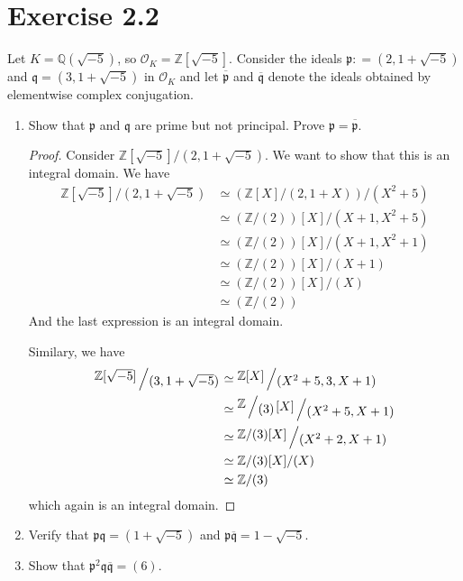 \documentclass[a4paper]{article}
\newcommand{\bigslant}[2]{{\raisebox{.2em}{$#1$}\left/\raisebox{-.2em}{$#2$}\right.}}
\begin{document}
\section*{Exercise 2.2}
Let \(K = \mathbb{Q}(\sqrt{-5})\), so \(\mathcal{O}_K = \mathbb{Z}[\sqrt{-5}]\). Consider the ideals \(\mathfrak{p}: = (2, 1 + \sqrt{-5})\) and \(\mathfrak{q} = (3, 1 + \sqrt{-5})\) in \(\mathcal{O}_K\) and let \(\overline{\mathfrak{p}}\) and \(\overline{\mathfrak{q}}\) denote the ideals obtained by elementwise complex conjugation.
\begin{enumerate}
  \item Show that \(\mathfrak{p}\) and \(\mathfrak{q}\) are prime but not principal. Prove \(\mathfrak{p} = \overline{\mathfrak{p}}\).
  \begin{proof}
    Consider \(\mathbb{Z}[\sqrt{-5}] / (2, 1 + \sqrt{-5})\). We want to show that this is an integral domain. We have
    \begin{align*}
      \mathbb{Z}[\sqrt{-5}] / (2, 1 + \sqrt{-5}) &\simeq (\mathbb{Z}[X] / (2, 1 + X)) / (X^2 + 5) \\
      & \simeq (\mathbb{Z} / (2)) [X] / (X + 1, X^2 + 5) \\
      & \simeq (\mathbb{Z} / (2)) [X] / (X + 1, X^2 + 1) \\
      & \simeq (\mathbb{Z} / (2)) [X] / (X + 1) \\
      & \simeq (\mathbb{Z} / (2)) [X] / (X) \\
      & \simeq (\mathbb{Z} / (2))
    \end{align*}
    And the last expression is an integral domain.

    Similary, we have
    \begin{align*}
      \bigslant{\mathbb{Z}[\sqrt{-5}]}{(3, 1 + \sqrt{-5})} &\simeq \bigslant{\mathbb{Z}[X]}{(X^2 + 5, 3, X + 1)} \\
      &\simeq \bigslant{\bigslant{\mathbb{Z}}{(3)}[X]}{(X^2 +5, X + 1)}\\
      &\simeq \bigslant{\mathbb{Z}/(3) [X]}{(X^2 + 2, X + 1)} \\
      &\simeq \mathbb{Z} / (3) [X] / (X) \\
      &\simeq \mathbb{Z} / (3)
    \end{align*}
    which again is an integral domain.
  \end{proof}
  \item Verify that \(\mathfrak{p}\mathfrak{q} = (1 + \sqrt{-5})\) and \(\mathfrak{p}\overline{\mathfrak{q}} = 1 - \sqrt{-5}\).
  \item Show that \(\mathfrak{p}^2 \mathfrak{q}\overline{\mathfrak{q}} = (6)\).
\end{enumerate}
\end{document}

